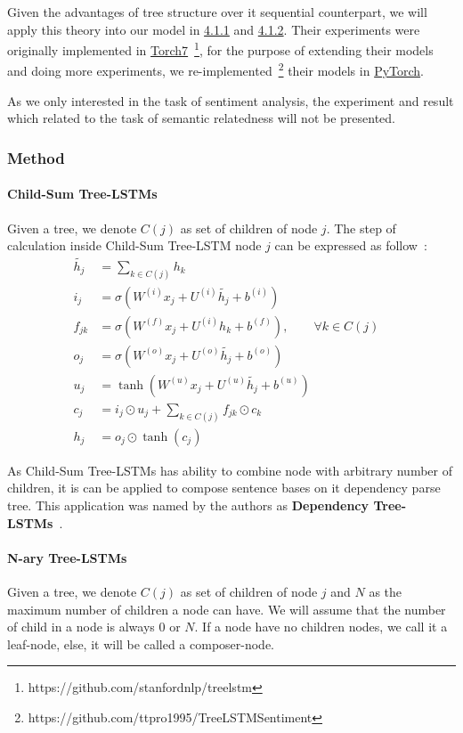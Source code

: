 Given the advantages of tree structure over it sequential counterpart, we will apply this theory into our model in \hyperref[sec:VTtree]{4.1.1} and \hyperref[sec:CNNtree]{4.1.2}. 
Their experiments were originally implemented in \hyperref[sec:torch]{Torch7}~\footnote{https://github.com/stanfordnlp/treelstm}, for the purpose of extending their models and doing more experiments, we re-implemented~\footnote{https://github.com/ttpro1995/TreeLSTMSentiment} their models in \hyperref[sec:pytorch]{PyTorch}. 

As we only interested in  the task of sentiment analysis, the experiment and result which related to the task of semantic relatedness will not be presented.

\subsubsection{Method}
\paragraph{Child-Sum Tree-LSTMs}
Given a tree, we denote \(C(j)\) as set of children of node \(j\).
The step of calculation inside Child-Sum Tree-LSTM node \(j\) can be expressed as follow~\cite{treeLSTM}:
\begin{align}
  	\tilde{h_j} &= \sum_{k \in C(j)} h_k &\label{eq1:2}\\
  	i_j &= \sigma{(W^{(i)}x_j + U^{(i)}\tilde{h_j} + b^{(i)})} &\label{eq1:3}\\
  	f_{jk} &= \sigma{(W^{(f)}x_j + U^{(i)}h_k + b^{(f)})}, \qquad  \forall k \in C(j) & \label{eq1:foget1}\\
  	o_j &= \sigma{(W^{(o)}x_j + U^{(o)}\tilde{h_j} + b^{(o)})} &\label{eq1:5}\\
  	u_j &= \tanh{(W^{(u)}x_j + U^{(u)}\tilde{h_j} + b^{(u)})} &\label{eq1:6}\\
   	c_j &= i_j \odot u_j + \sum_{k \in C(j)} f_{jk} \odot c_k & \\
	h_j &= o_j \odot \tanh{(c_j)} &
\end{align}

As Child-Sum Tree-LSTMs has ability to combine node with arbitrary number of children, it is can be applied to compose sentence bases on it dependency parse tree.
This application was named by the authors as \textbf{Dependency Tree-LSTMs}~\cite{treeLSTM}.

\paragraph{N-ary Tree-LSTMs}
Given a tree, we denote \(C(j)\) as set of children of node \(j\) and \(N\) as the maximum number of children a node can have. 
We will assume that the number of child in a node is always \(0\) or \(N\). 
If a node have no children nodes, we call it a leaf-node, else, it will be called a composer-node. 

